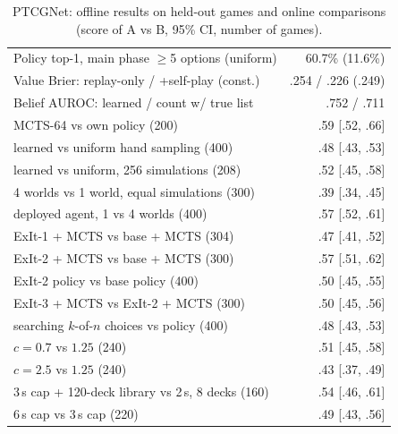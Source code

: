 \documentclass{article}
\begin{document}
\begin{table}[h]
\caption{PTCGNet: offline results on held-out games and online comparisons (score of A vs B, 95\% CI, number of games).}
\label{tab:abl}
\begin{center}
\begin{small}
\begin{tabular}{@{}lr@{}}
\toprule
Policy top-1, main phase $\geq$5 options (uniform) & 60.7\% (11.6\%) \\
Value Brier: replay-only / +self-play (const.) & .254 / .226 (.249) \\
Belief AUROC: learned / count w/ true list & .752 / .711 \\
\midrule
MCTS-64 vs own policy (200) & .59 [.52, .66] \\
learned vs uniform hand sampling (400) & .48 [.43, .53] \\
learned vs uniform, 256 simulations (208) & .52 [.45, .58] \\
4 worlds vs 1 world, equal simulations (300) & .39 [.34, .45] \\
deployed agent, 1 vs 4 worlds (400) & .57 [.52, .61] \\
ExIt-1 + MCTS vs base + MCTS (304) & .47 [.41, .52] \\
ExIt-2 + MCTS vs base + MCTS (300) & .57 [.51, .62] \\
ExIt-2 policy vs base policy (400) & .50 [.45, .55] \\
ExIt-3 + MCTS vs ExIt-2 + MCTS (300) & .50 [.45, .56] \\
searching $k$-of-$n$ choices vs policy (400) & .48 [.43, .53] \\
$c=0.7$ vs $1.25$ (240) & .51 [.45, .58] \\
$c=2.5$ vs $1.25$ (240) & .43 [.37, .49] \\
3\,s cap + 120-deck library vs 2\,s, 8 decks (160) & .54 [.46, .61] \\
6\,s cap vs 3\,s cap (220) & .49 [.43, .56] \\
\bottomrule
\end{tabular}
\end{small}
\end{center}
\end{table}
\end{document}
